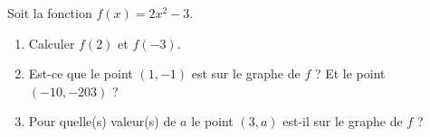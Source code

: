
\begin{exercice}\label{exosmath-0298}

    Soit la fonction \( f(x)=2x^2-3\).
    \begin{enumerate}
        \item
            Calculer \( f(2)\) et \( f(-3)\).
        \item
            Est-ce que le point \( (1,-1)\) est sur le graphe de \( f\) ? Et le point \( (-10,-203)\) ?
        \item
            Pour quelle(s) valeur(s) de \( a\) le point \( (3,a)\) est-il sur le graphe de \( f\) ?
    \end{enumerate}

\end{exercice}
